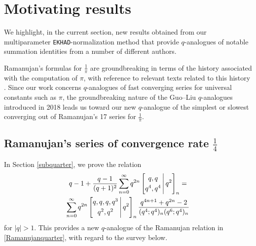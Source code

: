 \documentclass[12pt]{article}
\begin{document}
\section{Motivating results}\label{sectionMotivating}
 We highlight, in the current section, new results obtained from our multiparameter {\tt EKHAD}-normalization method that provide 
 $q$-analogues of notable summation identities from a number of different authors. 

 Ramanujan's formulas for $\frac{1}{\pi}$ are groundbreaking in terms of the history associated with the computation of $\pi$, with 
 reference to relevant texts related to this history 
 \cite{ArndtHaenel2001,BerggrenBorweinBorwein2004,BorweinBorwein1987}. 
 Since our work concerns $q$-analogues of fast converging series for universal constants such as $\pi$, 
 the groundbreaking nature of the 
 Guo--Liu $q$-analogues introduced in 2018 
 leads us toward our new $q$-analogue of the simplest or slowest converging
 out of Ramanujan's 17 series for $\frac{1}{\pi}$. 
 
\subsection{Ramanujan's series of convergence rate $\frac{1}{4}$}\label{subRamanujan}
 In Section \ref{subquarter}, we prove the relation 
\begin{multline*}
 q - 1 + \frac{q-1}{(q+1)^2} \sum_{n=0}^{\infty} 
 q^{2n} \left[ \begin{matrix} 
 q, q \vspace{1mm} \\ 
 q^4, q^4 \end{matrix} \, \Bigg| \, q^{2} \right]_{n} = \\ \sum_{n=0}^{\infty} q^{2n} 
 \left[ \begin{matrix} 
 q, q, q, q^3 \vspace{1mm} \\ 
 q^2, q^2 \end{matrix} \, \Bigg| \, q^{2} \right]_{n} 
 \frac{q^{4n+1} + q^{2n} - 2}{ (q^4;q^4)_{n} (q^6;q^4)_{n}} 
\end{multline*}
 for $|q| > 1$. This provides a new $q$-analogue of 
 the Ramanujan relation in \eqref{Ramanujanquarter}, with regard to the survey below. 
\end{document}
